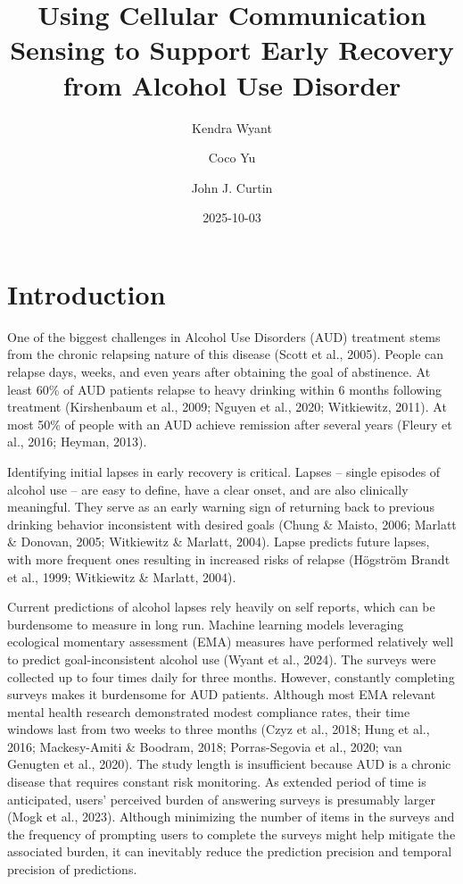 \documentclass[
  letterpaper,
  DIV=11,
  numbers=noendperiod]{scrartcl}
\title{Using Cellular Communication Sensing to Support Early Recovery
from Alcohol Use Disorder}
\author{Kendra Wyant \and Coco Yu \and John J. Curtin}
\date{2025-10-03}
\begin{document}
\maketitle


\section{Introduction}\label{introduction}

One of the biggest challenges in Alcohol Use Disorders (AUD) treatment
stems from the chronic relapsing nature of this disease (Scott et al.,
2005). People can relapse days, weeks, and even years after obtaining
the goal of abstinence. At least 60\% of AUD patients relapse to heavy
drinking within 6 months following treatment (Kirshenbaum et al., 2009;
Nguyen et al., 2020; Witkiewitz, 2011). At most 50\% of people with an
AUD achieve remission after several years (Fleury et al., 2016; Heyman,
2013).

Identifying initial lapses in early recovery is critical. Lapses --
single episodes of alcohol use -- are easy to define, have a clear
onset, and are also clinically meaningful. They serve as an early
warning sign of returning back to previous drinking behavior
inconsistent with desired goals (Chung \& Maisto, 2006; Marlatt \&
Donovan, 2005; Witkiewitz \& Marlatt, 2004). Lapse predicts future
lapses, with more frequent ones resulting in increased risks of relapse
(Högström Brandt et al., 1999; Witkiewitz \& Marlatt, 2004).

Current predictions of alcohol lapses rely heavily on self reports,
which can be burdensome to measure in long run. Machine learning models
leveraging ecological momentary assessment (EMA) measures have performed
relatively well to predict goal-inconsistent alcohol use (Wyant et al.,
2024). The surveys were collected up to four times daily for three
months. However, constantly completing surveys makes it burdensome for
AUD patients. Although most EMA relevant mental health research
demonstrated modest compliance rates, their time windows last from two
weeks to three months (Czyz et al., 2018; Hung et al., 2016;
Mackesy-Amiti \& Boodram, 2018; Porras-Segovia et al., 2020; van
Genugten et al., 2020). The study length is insufficient because AUD is
a chronic disease that requires constant risk monitoring. As extended
period of time is anticipated, users' perceived burden of answering
surveys is presumably larger (Mogk et al., 2023). Although minimizing
the number of items in the surveys and the frequency of prompting users
to complete the surveys might help mitigate the associated burden, it
can inevitably reduce the prediction precision and temporal precision of
predictions.
\end{document}
